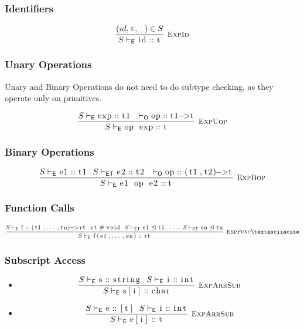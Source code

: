 \documentclass{article}
\newcommand{\code}[1]{\lstinline[columns=fixed]{#1}}
\newcommand{\drmrule}[5]{\frac{#1}{#2\vdash_{\mathsf{#3}}#4}\textsc{\ \small{#5}}}
\newcommand{\ruleapp}[1]{\vdash_{\mathsf{#1}}}
\newcommand{\mc}[1]{\textnormal{\code{#1}}}
\begin{document}
			\subsubsection{Identifiers}
			
				\begin{align*}
					\drmrule{(id,\mc{t},\_)\in S}{S}{E}{\mc{id} :: \mc{t}}{ExpId}
				\end{align*}
			
			\subsubsection{Unary Operations}
			
				Unary and Binary Operations do not need to do subtype checking, as they operate only on primitives.
			
				\begin{align*}
					\drmrule{S\ruleapp{E}\mc{exp}::\mc{t1}\ \ \ruleapp{O}\mc{op}::\mc{t1->t}}{S}{E}{\mc{op exp}::\mc{t}}{ExpUop}
				\end{align*}
			
			\subsubsection{Binary Operations}
			
				\begin{align*}
					\drmrule{S\ruleapp{E}\mc{e1}::\mc{t1}\ \ S\ruleapp{ET}\mc{e2}::\mc{t2}\ \ \ruleapp{O}\mc{op}::\mc{(t1,t2)->t}}{S}{E}{\mc{e1 op e2} :: \mc{t}}{ExpBop}
				\end{align*}
			
			\subsubsection{Function Calls}
			
				\begin{align*}
					\drmrule{S\ruleapp{E}\mc{f}::\mc{(t1,...,tn)->rt}\ \ \mc{rt}\not\equiv\mc{void}\ \  S\ruleapp{ET}\mc{e1}\trianglelefteq\mc{t1},\ \dots,\ S\ruleapp{ET}\mc{en}\trianglelefteq\mc{tn}}{S}{E}{\mc{f(e1,...,en)}::\mc{rt}}{ExpFunc}´
				\end{align*}
				
			\subsubsection{Subscript Access}
			
				\begin{itemize}
					\item
						\begin{align*}
							\drmrule{S\ruleapp{E}\mc{s}::\mc{string}\ \ S\ruleapp{E}\mc{i}::\mc{int}}{S}{E}{\mc{s[i]} :: \mc{char}}{ExpArrSub}
						\end{align*}
					\item
						\begin{align*}
							\drmrule{S\ruleapp{E}\mc{e}::\mc{[t]}\ \ S\ruleapp{E}\mc{i}::\mc{int}}{S}{E}{\mc{e[i]} :: \mc{t}}{ExpArrSub}
						\end{align*}
				\end{itemize}
			
\end{document}
